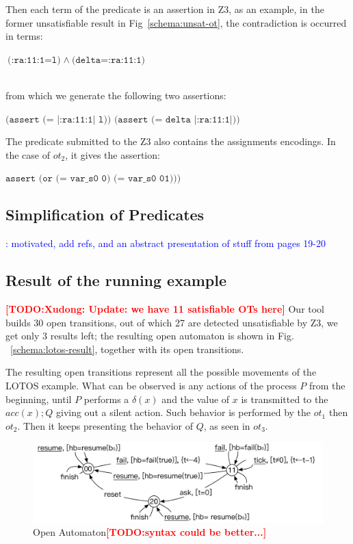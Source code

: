 \documentclass{lncs/llncs}
\newcommand{\TODO}[1]{\textcolor{red}{\textbf{[TODO:#1]}}}
\newcommand{\ERIC}[1]{\textcolor{blue}{#1}}
\newcommand{\OTvar}{\texttt}
\newcommand{\OTland}{\;\land\ }
\begin{document}
\noindent Then each term of the
predicate is an assertion in Z3, as an example, in the former
unsatisfiable result in Fig~\ref{schema:unsat-ot}, the contradiction is occurred in terms: \\
\centerline{$\OTvar{(:ra:11:1=l)} \OTland \OTvar{(delta=:ra:11:1)}$}\\
from which we generate the following two assertions:\\
\centerline{$\OTvar{(assert\ (=\ |:ra:11:1|\ l))\ \ \ (assert\ (=\ delta\ |:ra:11:1|))}$}

\noindent The predicate submitted to the Z3 also contains the
assignments encodings.
In the case of $ot_2$, it
gives the assertion:\\
\centerline{$\OTvar{assert (or (= var\_s0 0) (= var\_s0 01)))}$}

\subsection{Simplification of Predicates}
\ERIC{: motivated, add refs, and an abstract presentation of stuff from pages 19-20}
  
\subsection{Result of the running example}
\label{section:full-result}

\TODO{Xudong: Update: we have 11 satisfiable OTs here}
Our tool builds 30 open
transitions, out of which 27 are detected unsatisfiable by Z3, we
get only 3 results left; the resulting open automaton is shown in
Fig. ~\ref{schema:lotos-result}, together with its open transitions.

The resulting open transitions represent all the
possible movements of the LOTOS example.
What can be observed is any actions of the process $P$ from the beginning, until $P$ performs a $\delta(x)$ and the value of
$x$ is transmitted to the $acc(x);Q$ giving out a silent action. Such behavior is performed by the $ot_1$ then $ot_2$. 
Then it keeps presenting the behavior of $Q$, as seen in $ot_3$. 

\begin{figure}[t]
   \centerline{\includegraphics[width=12cm]{XFIG/BIPresult-ArchFailureTimerMax}}
   \caption{Open Automaton\TODO{syntax could be better...}}  \label{schema:resultOA}
 \end{figure}
\end{document}
